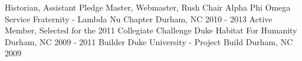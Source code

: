 \begin{cventries}
    \cventry
        {Historian, Assistant Pledge Master, Webmaster, Rush Chair}
        {Alpha Phi Omega Service Fraternity - Lambda Nu Chapter}
        {Durham, NC}
        {2010 - 2013}
    \cventry
        {Active Member, Selected for the 2011 Collegiate Challenge}
        {Duke Habitat For Humanity}
        {Durham, NC}
        {2009 - 2011}
    \cventry
        {Builder}
        {Duke University - Project Build}
        {Durham, NC}
        {2009}
\end{cventries}

